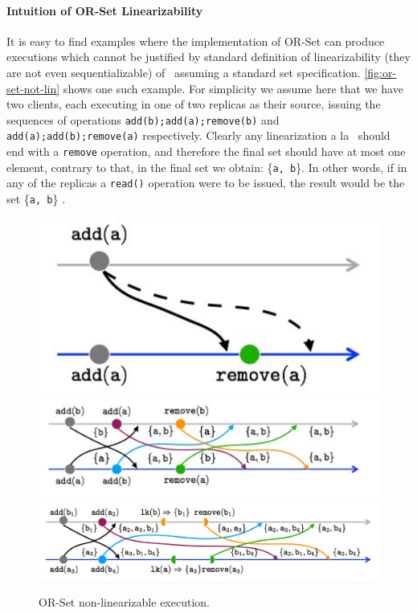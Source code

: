 \paragraph{Intuition of OR-Set Linearizability}


It is easy to find examples where the implementation of OR-Set can
produce executions which cannot be justified by standard definition of
linearizability (they are not even sequentializable)
of~\citet{HerlihyW90} assuming a standard set specification.
%
\autoref{fig:or-set-not-lin} shows one such example.
%
For simplicity we assume here that we have two clients, each executing
in one of two replicas as their source, issuing the sequences of
operations \lstinline|add(b);add(a);remove(b)| and
\lstinline|add(a);add(b);remove(a)| respectively.
%
Clearly any linearization a la~\citet{HerlihyW90} should end with a
\lstinline|remove| operation, and therefore the final set should have
at most one element, contrary to that, in the final set we obtain:
\{\lstinline|a, b|\}.
%
In other words, if in any of the replicas a \lstinline|read()|
operation were to be issued, the result would be the set
\{\lstinline|a, b|\} .

\begin{figure}[t]
  \centering
  \includegraphics[width=0.30 \textwidth]{./figures/OR-Set-simple}
  \includegraphics[width=0.70 \textwidth]{./figures/OR-Set-weird}
  \includegraphics[width=0.90 \textwidth]{./figures/OR-Set-lk-rem}
  \caption{OR-Set non-linearizable execution.}
  \label{fig:or-set-not-lin}
\end{figure}


